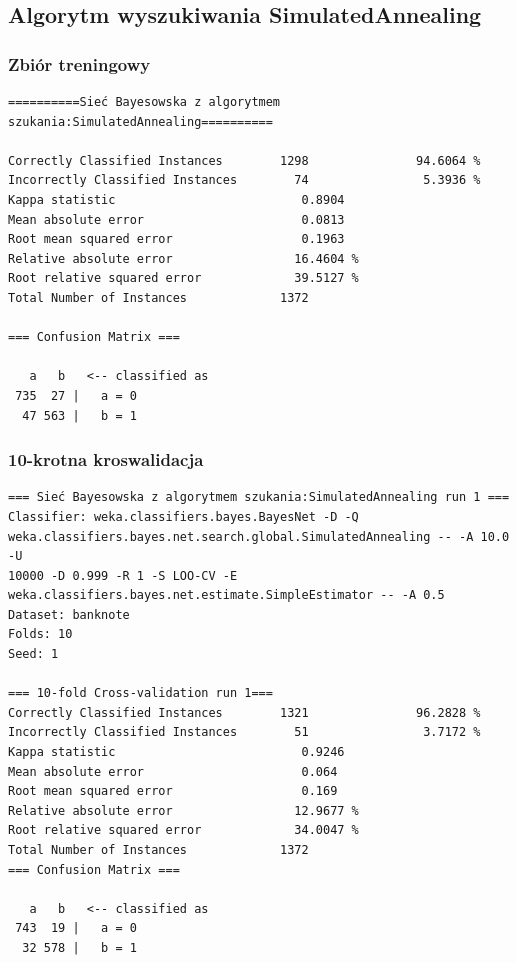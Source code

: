 \documentclass{classrep}
\begin{document}
\subsection{Algorytm wyszukiwania SimulatedAnnealing}
\subsubsection*{Zbiór treningowy}
\scriptsize 
\begin{verbatim}
==========Sieć Bayesowska z algorytmem szukania:SimulatedAnnealing==========

Correctly Classified Instances        1298               94.6064 %
Incorrectly Classified Instances        74                5.3936 %
Kappa statistic                          0.8904
Mean absolute error                      0.0813
Root mean squared error                  0.1963
Relative absolute error                 16.4604 %
Root relative squared error             39.5127 %
Total Number of Instances             1372     

=== Confusion Matrix ===

   a   b   <-- classified as
 735  27 |   a = 0
  47 563 |   b = 1
\end{verbatim} 
\normalsize
\subsubsection*{10-krotna kroswalidacja}
\scriptsize 
\begin{verbatim}
=== Sieć Bayesowska z algorytmem szukania:SimulatedAnnealing run 1 ===
Classifier: weka.classifiers.bayes.BayesNet -D -Q
weka.classifiers.bayes.net.search.global.SimulatedAnnealing -- -A 10.0 -U
10000 -D 0.999 -R 1 -S LOO-CV -E weka.classifiers.bayes.net.estimate.SimpleEstimator -- -A 0.5
Dataset: banknote
Folds: 10
Seed: 1

=== 10-fold Cross-validation run 1===
Correctly Classified Instances        1321               96.2828 %
Incorrectly Classified Instances        51                3.7172 %
Kappa statistic                          0.9246
Mean absolute error                      0.064 
Root mean squared error                  0.169 
Relative absolute error                 12.9677 %
Root relative squared error             34.0047 %
Total Number of Instances             1372     
=== Confusion Matrix ===

   a   b   <-- classified as
 743  19 |   a = 0
  32 578 |   b = 1
\end{verbatim} 
\normalsize
\end{document}
